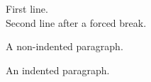 First line.\\
Second line after a forced break.

\noindent A non-indented paragraph.

\indent An indented paragraph.
